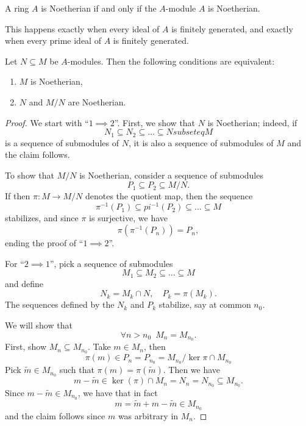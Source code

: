 \begin{df}
  A ring $A$ is Noetherian if and only if the $A$-module $A$ is Noetherian. 
\end{df}

\begin{prop}
  This happens exactly when every ideal of $A$ is finitely generated, and exactly when every prime ideal of $A$ is finitely generated.
\end{prop}

\begin{prop}
  \label{noetherian-extensions}
  Let $N \subseteq M$ be $A$-modules. Then the following conditions are equivalent:
  \begin{enumerate}
  \item $M$ is Noetherian,
  \item $N$ and $M/{N}$ are Noetherian.
  \end{enumerate}
\end{prop}
\begin{proof}
  We start with ``$1 \implies 2$''. First, we show that $N$ is Noetherian; indeed, if
  \[ N_1 \subseteq N_2 \subseteq \ldots \subseteq N subseteq M\]
  is a sequence of submodules of $N$, it is also a sequence of submodules of $M$ and the claim follows.

  To show that $M /{N}$ is Noetherian, consider a sequence of submodules
  \[ P_1 \subseteq P_2 \subseteq M /{N}.\]
  If then $\pi \colon M \to M /{N}$ denotes the quotient map, then the sequence
  \[ \pi^{-1}(P_1) \subseteq pi^{-1}(P_2) \subseteq \ldots \subseteq M\]
  stabilizes, and since $\pi$ is surjective, we have
  \[ \pi(\pi^{-1}(P_n)) = P_n,\]
  ending the proof of ``$1 \implies 2$''.

  For ``$2 \implies 1$'', pick a sequence of submodules
  \[M_1 \subseteq M_2 \subseteq \ldots \subseteq M\]
  and define
  \[ N_k = M_k \cap N, \quad P_k = \pi(M_k).\]
  The sequences defined by the $N_k$ and $P_k$ stabilize, say at common $n_0$.

  We will show that
  \[ \forall n > n_0 \enspace M_n = M_{n_0}.\]
  First, show $M_n \subseteq M_{n_0}$. Take $m \in M_n$, then
  \[ \pi(m) \in P_n = P_{n_0} = M_{n_0} / {\ker \pi \cap M_{n_0}}\]
  Pick $\tilde m \in M_{n_0}$ such that $\pi(m) = \pi(\tilde m)$.
  Then we have
  \[ m - \tilde{m} \in \ker(\pi) \cap M_n = N_n = N_{n_0} \subseteq M_{n_0}.\]
  Since $m-\tilde{m} \in M_{n_0}$, we have that
  in fact
  \[ m = \tilde{m} + m - \tilde{m} \in M_{n_0}\]
  and the claim follows since $m$ was arbitrary in $M_n$.
\end{proof}


